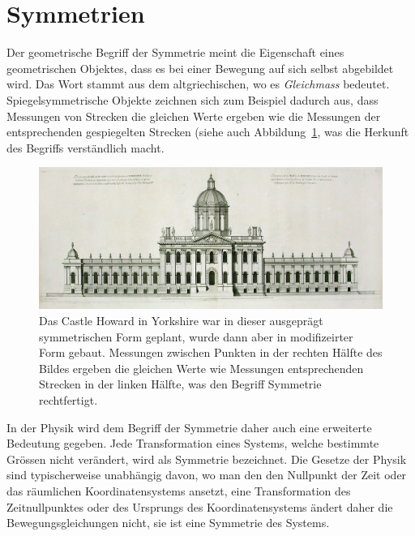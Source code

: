 %
%
%
\section{Symmetrien
\label{buch:section:symmetrien}}
Der geometrische Begriff der Symmetrie meint die Eigenschaft eines
geometrischen Objektes, dass es bei einer Bewegung auf sich selbst
abgebildet wird.
Das Wort stammt aus dem altgriechischen, wo es {\em Gleichmass}
bedeutet.
Spiegelsymmetrische Objekte zeichnen sich zum Beispiel dadurch aus,
dass Messungen von Strecken die gleichen Werte ergeben wie die Messungen
der entsprechenden gespiegelten Strecken (siehe auch
Abbildung~\ref{buch:lie:bild:castlehoward}, was die Herkunft des
Begriffs verständlich macht.
\begin{figure}
\centering
\includegraphics[width=\textwidth]{chapters/60-gruppen/images/castle.jpeg}
\caption{Das Castle Howard in Yorkshire war in dieser ausgeprägt symmetrischen
Form geplant, wurde dann aber in modifizeirter Form gebaut.
Messungen zwischen Punkten in der rechten Hälfte des Bildes
ergeben die gleichen Werte wie Messungen entsprechenden Strecken
in der linken Hälfte, was den Begriff Symmetrie rechtfertigt.
\label{buch:lie:bild:castlehoward}}
\end{figure}
In der Physik wird dem Begriff der Symmetrie daher auch eine erweiterte
Bedeutung gegeben.
Jede Transformation eines Systems, welche bestimmte Grössen nicht
verändert, wird als Symmetrie bezeichnet.
Die Gesetze der Physik sind typischerweise unabhängig davon, wo man den
den Nullpunkt der Zeit oder das räumlichen Koordinatensystems ansetzt,
eine Transformation des Zeitnullpunktes oder des Ursprungs des
Koordinatensystems ändert daher die Bewegungsgleichungen nicht, sie ist
eine Symmetrie des Systems.


